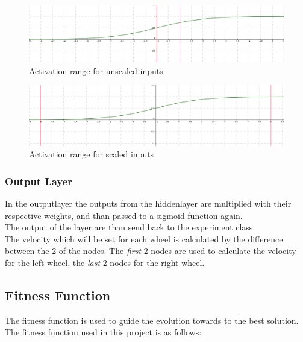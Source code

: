 \begin{figure}[h]
\begin{center}
\includegraphics[scale=0.4]{Chapter2/images/unscaled.PNG}
\caption[Activation range for unscaled inputs]{Activation range for unscaled inputs\footnotemark}
\label{fig:unscaled}
\end{center}
\end{figure}
\begin{figure}[h]
\begin{center}
\includegraphics[scale=0.4]{Chapter2/images/scaled.PNG}
\caption[Activation range for scaled inputs]{Activation range for scaled inputs\footnotemark}
\label{fig:scaled}
\end{center}
\end{figure}

\subsubsection{Output Layer}
In the outputlayer the outputs from the hiddenlayer are multiplied with their respective weights, and than passed to a sigmoid function again.\\
The output of the layer are than send back to the experiment class.\\
The velocity which will be set for each wheel is calculated by the difference between the 2 of the nodes. 
The \textit{first} 2 nodes are used to calculate the velocity for the left wheel, the \textit{last} 2 nodes for the right wheel. 

\subsection{Fitness Function}\label{chap2:fitness_function}
The fitness function is used to guide the evolution towards to the best solution.\\
The fitness function used in this project is as follows:

